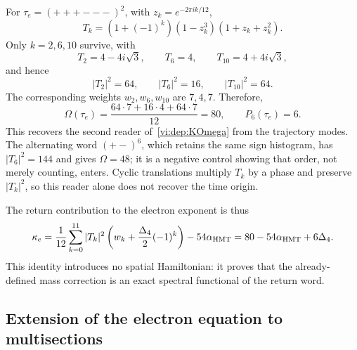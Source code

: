 For $\tau_e=(+++---)^2$, with $z_k=e^{-2\pi ik/12}$,
\begin{equation}
 T_k=(1+(-1)^k)(1-z_k^3)(1+z_k+z_k^2).
 \label{vi:eq:factorizacion-tk-electron}
\end{equation}
Only $k=2,6,10$ survive, with
\[
 T_2=4-4i\sqrt3,\qquad T_6=4,\qquad
 T_{10}=4+4i\sqrt3,
\]
and hence
\begin{equation}
 |T_2|^2=64,\qquad |T_6|^2=16,\qquad |T_{10}|^2=64.
 \label{vi:eq:potencias-espectrales-electron}
\end{equation}
The corresponding weights $w_2,w_6,w_{10}$ are $7,4,7$. Therefore,
\begin{equation}
 \Omega(\tau_e)=\frac{64\cdot7+16\cdot4+64\cdot7}{12}=80,
 \qquad P_6(\tau_e)=6.
 \label{vi:eq:omega-p6-electron}
\end{equation}
This recovers the second reader of~\eqref{vi:dep:KOmega} from the trajectory
modes. The alternating word $(+-)^6$, which retains the same sign histogram,
has $|T_6|^2=144$ and gives $\Omega=48$; it is a negative control showing
that order, not merely counting, enters. Cyclic translations multiply $T_k$
by a phase and preserve $|T_k|^2$, so this reader alone does not recover the
time origin.

The return contribution to the electron exponent is thus
\begin{equation}
 \kappa_e=
 \frac1{12}\sum_{k=0}^{11}|T_k|^2
 \left(w_k+\frac{\Delta_4}{2}(-1)^k\right)-54\alpha_{\rm HMT}
 =80-54\alpha_{\rm HMT}+6\Delta_4.
 \label{vi:eq:kappa-espectral-electron}
\end{equation}
This identity introduces no spatial Hamiltonian: it proves that the
already-defined mass correction is an exact spectral functional of the return
word.

\subsection{Extension of the electron equation to multisections}

